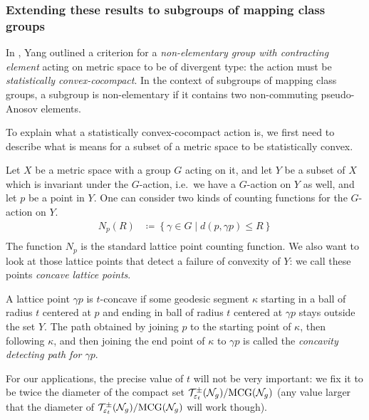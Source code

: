 \subsubsection{Extending these results to subgroups of mapping class groups}
\label{sec:extend-these-results}

In \cite{10.1093/imrn/rny001}, Yang outlined a criterion for a \emph{non-elementary group with contracting element} acting on metric space to be of divergent type: the action must be \emph{statistically convex-cocompact}.
In the context of subgroups of mapping class groups, a subgroup is non-elementary if it contains two non-commuting pseudo-Anosov elements.

To explain what a statistically convex-cocompact action is, we first need to describe what is means for a subset of a metric space to be statistically convex.

Let $X$ be a metric space with a group $G$ acting on it, and let $Y$ be a subset of $X$ which is invariant under the $G$-action, i.e.\ we have a $G$-action on $Y$ as well, and let $p$ be a point in $Y$.
One can consider two kinds of counting functions for the $G$-action on $Y$.
\begin{align*}
  N_p(R) &\coloneqq \left\{ \gamma \in G \mid d(p, \gamma p) \leq R \right\} \\
\end{align*}
The function $N_p$ is the standard lattice point counting function.
We also want to look at those lattice points that detect a failure of convexity of $Y$: we call these points \emph{concave lattice points}.
\begin{definition}
  A lattice point $\gamma p$ is $t$-concave if some geodesic segment $\kappa$ starting in a ball of radius $t$ centered at $p$ and ending in ball of radius $t$ centered at $\gamma p$ stays outside the set $Y$.
  The path obtained by joining $p$ to the starting point of $\kappa$, then following $\kappa$, and then joining the end point of $\kappa$ to $\gamma p$ is called the \emph{concavity detecting path for $\gamma p$}.
\end{definition}
For our applications, the precise value of $t$ will not be very important: we fix it to be twice the diameter of the compact set $\mathcal{T}_{\varepsilon_t}^{\pm}(\mathcal{N}_g)/\mathrm{MCG}(\mathcal{N}_g)$ (any value larger that the diameter of $\mathcal{T}_{\varepsilon_t}^{\pm}(\mathcal{N}_g)/\mathrm{MCG}(\mathcal{N}_g)$ will work though).

